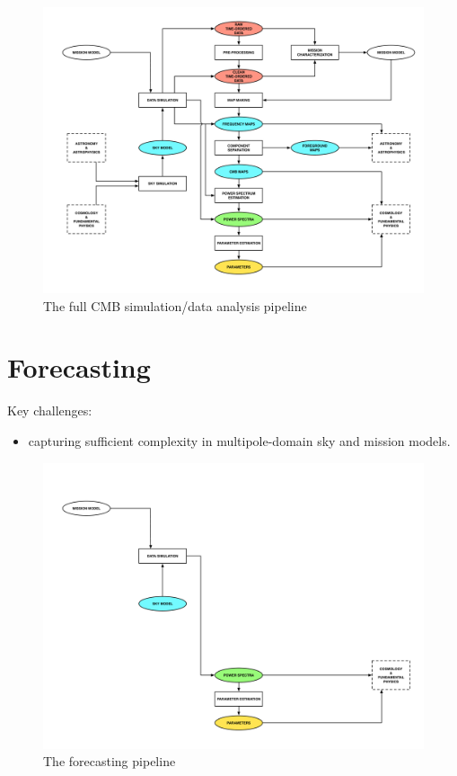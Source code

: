 \begin{figure}[htbp]
\centering
\includegraphics[width=1\textwidth]{Analysis/simda}
\caption{The full CMB simulation/data analysis pipeline}
\label{default}

\end{figure}

\newpage

\section{Forecasting}

Key challenges: 
\begin{itemize}
\item capturing sufficient complexity in multipole-domain sky and mission models.
\end{itemize}

\begin{figure}[htbp]
\centering
\includegraphics[width=1\textwidth]{Analysis/fc}
\caption{The forecasting pipeline}
\label{default}

\end{figure}

